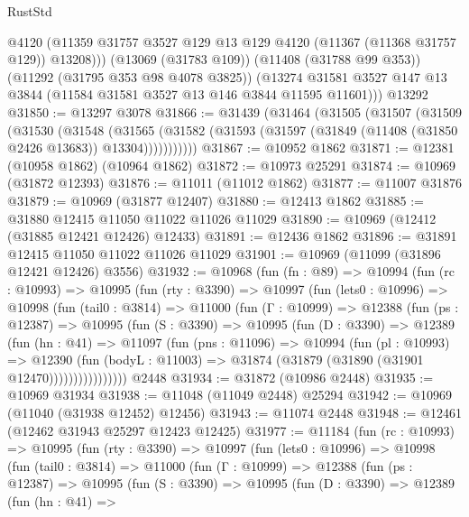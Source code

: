 \begin{lexlean}{RustStd}
\begin{coremodule}
          @4120
          (@11359 @31757 @3527 @129 @13 @129 @4120 (@11367 (@11368 @31757 @129)) @13208)))
      (@13069 (@31783 @109))
      (@11408 (@31788 @99 @353))
      (@11292 (@31795 @353 @98 @4078 @3825))
      (@13274 @31581 @3527 @147 @13 @3844 (@11584 @31581 @3527 @13 @146 @3844 @11595 @11601)))
    @13292
@31850 := @13297 @3078
@31866 := @31439
    (@31464
      (@31505
        (@31507
          (@31509
            (@31530
              (@31548
                (@31565
                  (@31582 (@31593 (@31597 (@31849 (@11408 (@31850 @2426 @13683)) @13304)))))))))))
@31867 := @10952 @1862
@31871 := @12381 (@10958 @1862) (@10964 @1862)
@31872 := @10973 @25291
@31874 := @10969 (@31872 @12393)
@31876 := @11011 (@11012 @1862)
@31877 := @11007 @31876
@31879 := @10969 (@31877 @12407)
@31880 := @12413 @1862
@31885 := @31880 @12415 @11050 @11022 @11026 @11029
@31890 := @10969 (@12412 (@31885 @12421 @12426) @12433)
@31891 := @12436 @1862
@31896 := @31891 @12415 @11050 @11022 @11026 @11029
@31901 := @10969 (@11099 (@31896 @12421 @12426) @3556)
@31932 := @10968
    (fun (fn : @89) =>
    @10994
      (fun (rc : @10993) =>
      @10995
        (fun (rty : @3390) =>
        @10997
          (fun (lets0 : @10996) =>
          @10998
            (fun (tail0 : @3814) =>
            @11000
              (fun (Γ : @10999) =>
              @12388
                (fun (ps : @12387) =>
                @10995
                  (fun (S : @3390) =>
                  @10995
                    (fun (D : @3390) =>
                    @12389
                      (fun (hn : @41) =>
                      @11097
                        (fun (pns : @11096) =>
                        @10994
                          (fun (pl : @10993) =>
                          @12390
                            (fun (bodyL : @11003) =>
                            @31874 (@31879 (@31890 (@31901 @12470))))))))))))))))
    @2448
@31934 := @31872 (@10986 @2448)
@31935 := @10969 @31934
@31938 := @11048 (@11049 @2448) @25294
@31942 := @10969 (@11040 (@31938 @12452) @12456)
@31943 := @11074 @2448
@31948 := @12461 (@12462 @31943 @25297 @12423 @12425)
@31977 := @11184
    (fun (rc : @10993) =>
    @10995
      (fun (rty : @3390) =>
      @10997
        (fun (lets0 : @10996) =>
        @10998
          (fun (tail0 : @3814) =>
          @11000
            (fun (Γ : @10999) =>
            @12388
              (fun (ps : @12387) =>
              @10995
                (fun (S : @3390) =>
                @10995
                  (fun (D : @3390) =>
                  @12389
                    (fun (hn : @41) =>

\end{coremodule}
\end{lexlean}

